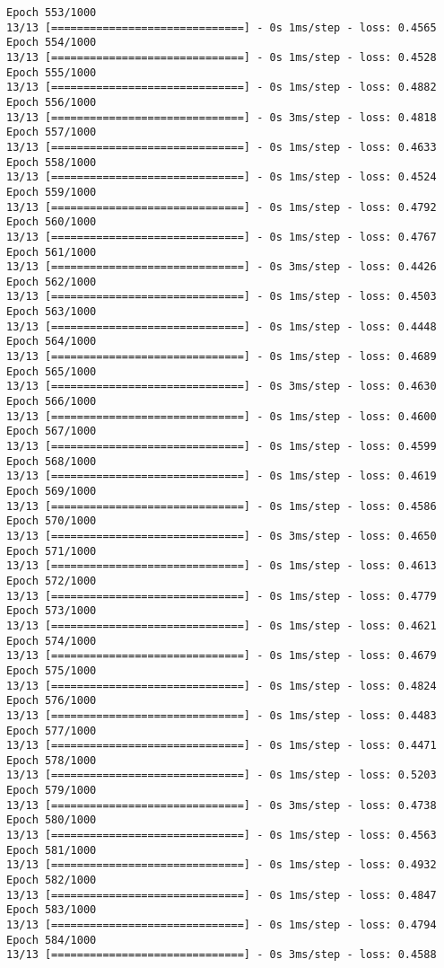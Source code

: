 \documentclass[11pt]{article}
\begin{document}
\begin{Verbatim}[commandchars=\\\{\}]
Epoch 553/1000
13/13 [==============================] - 0s 1ms/step - loss: 0.4565
Epoch 554/1000
13/13 [==============================] - 0s 1ms/step - loss: 0.4528
Epoch 555/1000
13/13 [==============================] - 0s 1ms/step - loss: 0.4882
Epoch 556/1000
13/13 [==============================] - 0s 3ms/step - loss: 0.4818
Epoch 557/1000
13/13 [==============================] - 0s 1ms/step - loss: 0.4633
Epoch 558/1000
13/13 [==============================] - 0s 1ms/step - loss: 0.4524
Epoch 559/1000
13/13 [==============================] - 0s 1ms/step - loss: 0.4792
Epoch 560/1000
13/13 [==============================] - 0s 1ms/step - loss: 0.4767
Epoch 561/1000
13/13 [==============================] - 0s 3ms/step - loss: 0.4426
Epoch 562/1000
13/13 [==============================] - 0s 1ms/step - loss: 0.4503
Epoch 563/1000
13/13 [==============================] - 0s 1ms/step - loss: 0.4448
Epoch 564/1000
13/13 [==============================] - 0s 1ms/step - loss: 0.4689
Epoch 565/1000
13/13 [==============================] - 0s 3ms/step - loss: 0.4630
Epoch 566/1000
13/13 [==============================] - 0s 1ms/step - loss: 0.4600
Epoch 567/1000
13/13 [==============================] - 0s 1ms/step - loss: 0.4599
Epoch 568/1000
13/13 [==============================] - 0s 1ms/step - loss: 0.4619
Epoch 569/1000
13/13 [==============================] - 0s 1ms/step - loss: 0.4586
Epoch 570/1000
13/13 [==============================] - 0s 3ms/step - loss: 0.4650
Epoch 571/1000
13/13 [==============================] - 0s 1ms/step - loss: 0.4613
Epoch 572/1000
13/13 [==============================] - 0s 1ms/step - loss: 0.4779
Epoch 573/1000
13/13 [==============================] - 0s 1ms/step - loss: 0.4621
Epoch 574/1000
13/13 [==============================] - 0s 1ms/step - loss: 0.4679
Epoch 575/1000
13/13 [==============================] - 0s 1ms/step - loss: 0.4824
Epoch 576/1000
13/13 [==============================] - 0s 1ms/step - loss: 0.4483
Epoch 577/1000
13/13 [==============================] - 0s 1ms/step - loss: 0.4471
Epoch 578/1000
13/13 [==============================] - 0s 1ms/step - loss: 0.5203
Epoch 579/1000
13/13 [==============================] - 0s 3ms/step - loss: 0.4738
Epoch 580/1000
13/13 [==============================] - 0s 1ms/step - loss: 0.4563
Epoch 581/1000
13/13 [==============================] - 0s 1ms/step - loss: 0.4932
Epoch 582/1000
13/13 [==============================] - 0s 1ms/step - loss: 0.4847
Epoch 583/1000
13/13 [==============================] - 0s 1ms/step - loss: 0.4794
Epoch 584/1000
13/13 [==============================] - 0s 3ms/step - loss: 0.4588

\end{Verbatim}
\end{document}
